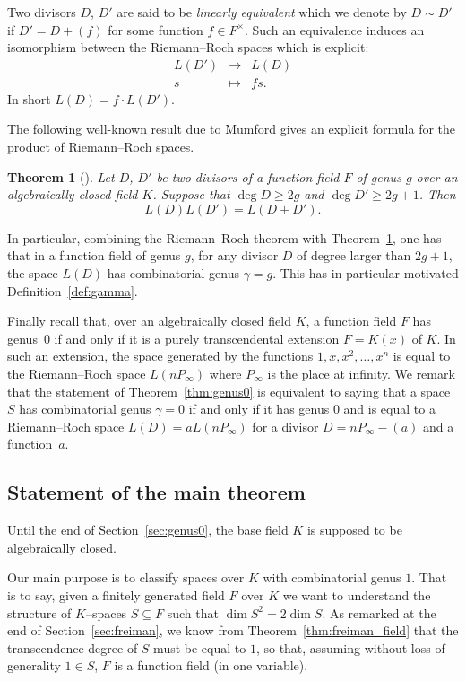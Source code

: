 \documentclass[10pt]{amsart}
\newtheorem{theo}{Theorem}[section]
\theoremstyle{definition}
\theoremstyle{remark}
\newcommand{\map}[4]{
\begin{array}{ccc}
#1 & \longrightarrow & #2 \\
#3 & \longmapsto & #4
\end{array}
}
\renewcommand{\geq}{\geqslant}
\begin{document}
Two divisors $D$, $D'$ are said to be \emph{linearly equivalent} which we denote by $D \sim D'$ if $D'= D+(f)$ for some function $f \in F^\times$. Such an equivalence induces an isomorphism between the Riemann--Roch spaces which is explicit:
\[
\map{L(D')}{L(D)}{s}{fs.}
\]
In short $L(D)= f \cdot L(D')$.

The following well-known result due to Mumford gives an explicit formula for the product of Riemann--Roch spaces.

\begin{theo}[{\cite[Theorem~6]{Mumford}}]\label{thm:mumford}
Let $D$, $D'$ be two divisors of a function field $F$ of genus $g$ {over an algebraically closed field $K$}. Suppose that $\deg D\geq2g$ and $\deg D'\geq2g+1$. Then
\[
L(D)L(D')= L(D+D').
\]
\end{theo}

In particular, combining the Riemann--Roch theorem with Theorem~\ref{thm:mumford}, one has that in a function field of genus $g$, for any divisor $D$ of degree larger than $2g+1$, the space $L(D)$ has combinatorial genus $\gamma=g$. This has in particular motivated Definition~\ref{def:gamma}.

Finally recall that, {over an algebraically closed field $K$}, a function field $F$ has genus~$0$ if and only if it is a purely transcendental extension $F=K(x)$ of $K$. In such an extension, the space generated by the functions $1,x,x^2,\ldots,x^n$ is equal to the Riemann--Roch space $L(nP_\infty)$ where $P_\infty$ is the place at infinity. We remark that the statement of Theorem~\ref{thm:genus0} is equivalent to saying that a space $S$ has combinatorial genus $\gamma=0$ if and only if it has genus $0$ and is equal to a Riemann--Roch space $L(D)=aL(nP_\infty)$ for a divisor $D=nP_\infty-(a)$ and a function~$a$.

\subsection{Statement of the main theorem}\label{sec:Vosper+1}
Until the end of Section~\ref{sec:genus0}, the base field $K$ is supposed to be algebraically closed.

Our main purpose is to classify spaces over $K$ with combinatorial genus $1$. That is to say, given a finitely generated field $F$ over $K$ we want to understand the structure of $K$--spaces $S \subseteq F$ such that $\dim S^2=2 \dim S$. As remarked at the end of Section~\ref{sec:freiman}, we know from Theorem~\ref{thm:freiman_field} that the transcendence degree of $S$ must be equal to $1$, so that, assuming without loss of generality $1\in S$, $F$ is a function field (in one variable).
\end{document}
